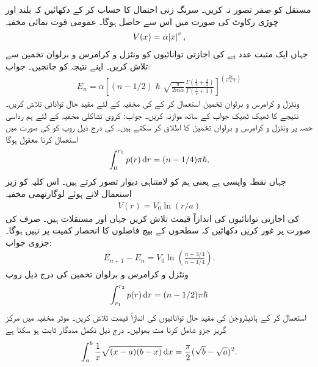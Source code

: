 مستقل  کو صفر تصور نہ کریں۔ سرنگ زنی احتمال  کا حساب کر کے دکھائیں کہ بلند اور چوڑی رکاوٹ کی صورت میں اس سے  حاصل ہوگا۔
عمومی قوت نمائی مخفیہ 
\begin{align*}
	V(x)=\alpha\abs{x}^{v},
\end{align*}
جہاں  ایک مثبت عدد ہے کی اجازتی توانائیوں کو ونٹزل و کرامرس و برلوان  تخمین سے تلاش کریں۔ اپنے نتیجہ کو  جانچیں۔ جواب:
\begin{align}
	E_{n}=\alpha\left[(n-1/2)\hslash\sqrt{\frac{\pi}{2m\alpha}}\frac{\Gamma\left(\frac{1}{v}+\frac{3}{2}\right)}{\Gamma\left(\frac{1}{v}+1\right)}\right]^{\left(\frac{2v}{v+2}\right)}
\end{align}
 ونٹزل و کرامرس و برلوان   تخمین استعمال کر کے  کی مخفیہ کے لئے مقید حال توانائی تلاش کریں۔ نتیجے کا ٹھیک ٹھیک جواب کے ساتھ موازنہ کریں۔ جواب: 
کروی تشاکلی مخفیہ کے لئے ہم رداسی حصہ  پر ونٹزل و کرامرس و برلوان  تخمین کا اطلاق کر سکتے ہیں۔  کی درج ذیل روپ کو  کی صورت میں استعمال کرنا معقول ہوگا 
\begin{align}
	\int^{r_{0}}_{0}p(r)\dif r=(n-1/4)\pi\hslash,
\end{align}
جہاں  نقطہ واپسی ہے یعنی ہم  کو لامتناہی دیوار تصور کرتے ہیں۔ اس کلیہ کو زیر استعمال لاتے ہوئے لوگارتھمی مخفیہ 
\begin{align*}
	V(r)=V_{0}\ln(r/a)
\end{align*}
کی اجازتی توانائیوں کی اندازاً قیمت تلاش کریں جہاں  اور  مستقلات ہیں۔ صرف  کی صورت پر غور کریں دکھائیں کہ سطحوں کے بیچ فاصلوں کا انحصار کمیت پر نہیں ہوگا۔ جزوی جواب:
\begin{align*}
	E_{n+1}-E_{n}=V_{0}\ln\left(\frac{n+3/4}{n-1/4}\right).
\end{align*}
 ونٹزل و کرامرس و برلوان   تخمین کی درج ذیل روپ
\begin{align}
	\int^{r_{2}}_{r_{1}}p(r)\dif r=(n-1/2)\pi\hslash
\end{align}
استعمال کر کے ہائیڈروجن کی مقید حال توانائیوں کی اندازاً قیمت تلاش کریں۔ موثر  مخفیہ  میں مرکز گریز جزو شامل کرنا مت بھولیں۔ درج ذیل تکمل مددگار ثابت ہو سکتا ہے
\begin{align}
	\int^{b}_{a}\frac{1}{x}\sqrt{(x-a)(b-x)}\dif x=\frac{\pi}{2}(\sqrt{b}-\sqrt{a})^{2}.
\end{align}
